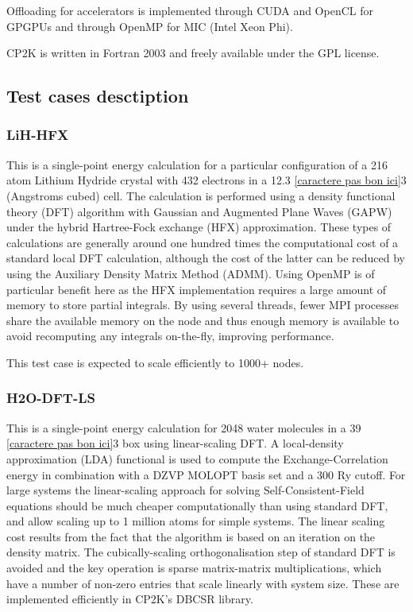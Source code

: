 Offloading for accelerators is implemented through CUDA and OpenCL for GPGPUs and through OpenMP for MIC (Intel Xeon Phi).

CP2K is written in Fortran 2003 and freely available under the GPL license.

\subsection{Test cases desctiption}
\subsubsection{LiH-HFX}
This is a single-point energy calculation for a particular configuration of a 216 atom Lithium Hydride crystal with 432 electrons in a 12.3 \ref{caractere pas bon ici}3 (Angstroms cubed) cell. The calculation is performed using a density functional theory (DFT) algorithm with Gaussian and Augmented Plane Waves (GAPW) under the hybrid Hartree-Fock exchange (HFX) approximation. These types of calculations are generally around one hundred times the computational cost of a standard local DFT calculation, although the cost of the latter can be reduced by using the Auxiliary Density Matrix Method (ADMM). Using OpenMP is of particular benefit here as the HFX implementation requires a large amount of memory to store partial integrals. By using several threads, fewer MPI processes share the available memory on the node and thus enough memory is available to avoid recomputing any integrals on-the-fly, improving performance.

This test case is expected to scale efficiently to 1000+ nodes.

\subsubsection{H2O-DFT-LS}
This is a single-point energy calculation for 2048 water molecules in a 39 \ref{caractere pas bon ici}3 box using linear-scaling DFT. A local-density approximation (LDA) functional is used to compute the Exchange-Correlation energy in combination with a DZVP MOLOPT basis set and a 300 Ry cutoff. For large systems the linear-scaling approach for solving Self-Consistent-Field equations should be much cheaper computationally than using standard DFT, and allow scaling up to 1 million atoms for simple systems. The linear scaling cost results from the fact that the algorithm is based on an iteration on the density matrix. The cubically-scaling orthogonalisation step of standard DFT is avoided and the key operation is sparse matrix-matrix multiplications, which have a number of non-zero entries that scale linearly with system size. These are implemented efficiently in CP2K's DBCSR library.

